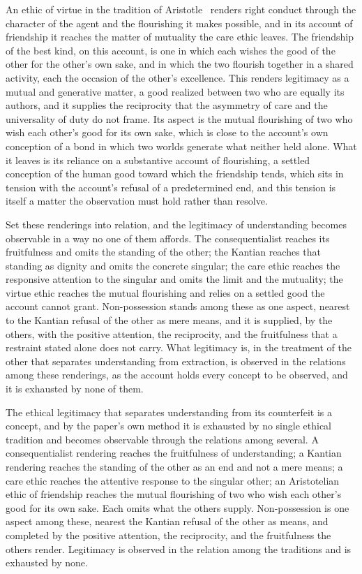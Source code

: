 An ethic of virtue in the tradition of Aristotle~\parencite{aristotle2000ethics} renders right conduct through the character of the agent and the flourishing it makes possible, and in its account of friendship it reaches the matter of mutuality the care ethic leaves. The friendship of the best kind, on this account, is one in which each wishes the good of the other for the other's own sake, and in which the two flourish together in a shared activity, each the occasion of the other's excellence. This renders legitimacy as a mutual and generative matter, a good realized between two who are equally its authors, and it supplies the reciprocity that the asymmetry of care and the universality of duty do not frame. Its aspect is the mutual flourishing of two who wish each other's good for its own sake, which is close to the account's own conception of a bond in which two worlds generate what neither held alone. What it leaves is its reliance on a substantive account of flourishing, a settled conception of the human good toward which the friendship tends, which sits in tension with the account's refusal of a predetermined end, and this tension is itself a matter the observation must hold rather than resolve.

Set these renderings into relation, and the legitimacy of understanding becomes observable in a way no one of them affords. The consequentialist reaches its fruitfulness and omits the standing of the other; the Kantian reaches that standing as dignity and omits the concrete singular; the care ethic reaches the responsive attention to the singular and omits the limit and the mutuality; the virtue ethic reaches the mutual flourishing and relies on a settled good the account cannot grant. Non-possession stands among these as one aspect, nearest to the Kantian refusal of the other as mere means, and it is supplied, by the others, with the positive attention, the reciprocity, and the fruitfulness that a restraint stated alone does not carry. What legitimacy is, in the treatment of the other that separates understanding from extraction, is observed in the relations among these renderings, as the account holds every concept to be observed, and it is exhausted by none of them.

\begin{claim}
The ethical legitimacy that separates understanding from its counterfeit is a concept, and by the paper's own method it is exhausted by no single ethical tradition and becomes observable through the relations among several. A consequentialist rendering reaches the fruitfulness of understanding; a Kantian rendering reaches the standing of the other as an end and not a mere means; a care ethic reaches the attentive response to the singular other; an Aristotelian ethic of friendship reaches the mutual flourishing of two who wish each other's good for its own sake. Each omits what the others supply. Non-possession is one aspect among these, nearest the Kantian refusal of the other as means, and completed by the positive attention, the reciprocity, and the fruitfulness the others render. Legitimacy is observed in the relation among the traditions and is exhausted by none.
\end{claim}

